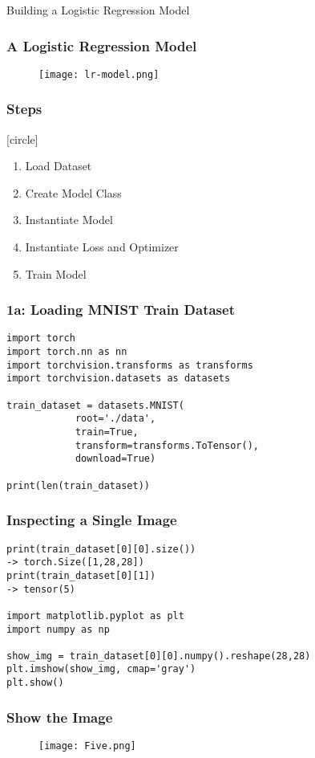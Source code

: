 \documentclass[14 pt]{beamer}
\let\olditem\item
\renewcommand{\item}{\olditem\vspace{4pt}}
\begin{document}
\begin{frame}
  \begin{center}
    \Large{Building a Logistic Regression Model}
  \end{center}
\end{frame}

\begin{frame}
  \frametitle{A Logistic Regression Model}
  \begin{figure}
    \centering
    \texttt{[image: lr-model.png]}
  \end{figure}
\end{frame}

\begin{frame}
  \frametitle{Steps}
     [circle]
  \begin{enumerate}
  \item Load Dataset
  \item Create Model Class
  \item Instantiate Model 
  \item Instantiate Loss and Optimizer 
  \item Train Model
  \end{enumerate}
\end{frame}

\begin{frame}[fragile]
  \frametitle{1a: Loading MNIST Train Dataset}

  \begin{block}{}
\begin{verbatim}
import torch
import torch.nn as nn
import torchvision.transforms as transforms
import torchvision.datasets as datasets

train_dataset = datasets.MNIST(
            root='./data', 
            train=True, 
            transform=transforms.ToTensor(),
            download=True)

print(len(train_dataset))
\end{verbatim}
  \end{block}
\end{frame}

\begin{frame}[fragile]
  \frametitle{Inspecting a Single Image}
\small{
  \begin{block}{}
\begin{verbatim}
print(train_dataset[0][0].size()) 
-> torch.Size([1,28,28])
print(train_dataset[0][1]) 
-> tensor(5)

import matplotlib.pyplot as plt
import numpy as np

show_img = train_dataset[0][0].numpy().reshape(28,28)
plt.imshow(show_img, cmap='gray')
plt.show()
\end{verbatim}
  \end{block}
}
\end{frame}
\begin{frame}
  \frametitle{Show the Image}
  \begin{figure}
    \centering
    \texttt{[image: Five.png]}
  \end{figure}
\end{frame}
\end{document}
